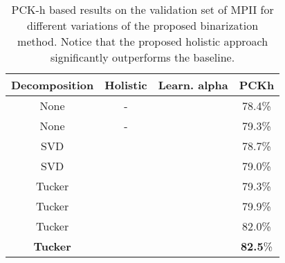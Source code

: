 \documentclass[10pt,twocolumn,letterpaper]{article}
\newcommand{\xmark}{\ding{55}}
\begin{document}
\begin{table}[!htbp]
\vspace{10pt}
\small
	\begin{center}
		\begin{tabular}{|c|c|c|c|}
			\hline
			Decomposition & Holistic & Learn. alpha & PCKh \\
			\hline\hline
			None & - & \xmark  & 78.4\% \\
			None & - & \checkmark  & 79.3\% \\
			SVD & \xmark & \xmark  & 78.7\% \\
			SVD & \xmark & \checkmark  & 79.0\% \\
			Tucker & \xmark & \xmark  & 79.3\% \\
			Tucker & \xmark & \checkmark  & 79.9\% \\
			Tucker & \checkmark & \xmark  & 82.0\% \\
			\textbf{Tucker} & \checkmark & \checkmark  & \textbf{82.5}\% \\
			
            \hline
		\end{tabular}
	\end{center}
	\caption{PCK-h based results on the validation set of MPII for different variations of the proposed binarization method. Notice that the proposed holistic approach significantly outperforms the baseline.}
	\label{tab:main-results-mpii}
\end{table}
\end{document}
